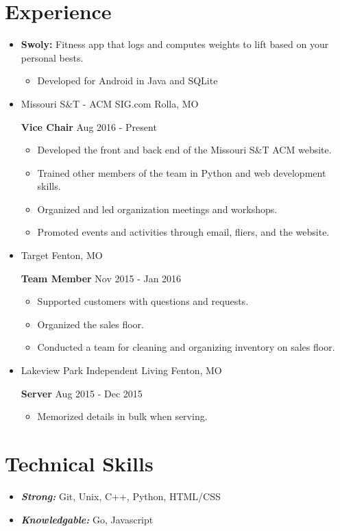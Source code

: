 \documentclass[11pt,oneside]{article}
\begin{document}
\section*{Experience}
\begin{itemize}
	\item[] \textbf{Swoly:} Fitness app that logs and computes weights to lift based on your personal bests.
			\begin{itemize}
				\item[\textbullet] Developed for Android in Java and SQLite
			\end{itemize}
\end{itemize}
\begin{itemize}
	\item[] Missouri S\&T - ACM SIG.com
			\hfill
			Rolla, MO
			
			\textbf{Vice Chair}
			\hfill
			Aug 2016 - Present
			\begin{itemize}
				\item[\textbullet] Developed the front and back end of the Missouri S\&T ACM website.
				\item[\textbullet] Trained other members of the team in Python and web development skills.
				\item[\textbullet] Organized and led organization meetings and workshops.
				\item[\textbullet] Promoted events and activities through email, fliers, and the website.
			\end{itemize}
	\item[] Target
			\hfill
			Fenton, MO
			
			\textbf{Team Member}
			\hfill
			Nov 2015 - Jan 2016
			\begin{itemize}
				\item[\textbullet] Supported customers with questions and requests.
				\item[\textbullet] Organized the sales floor.
				\item[\textbullet] Conducted a team for cleaning and organizing inventory on sales floor.
			\end{itemize}
	\item[] Lakeview Park Independent Living
			\hfill
			Fenton, MO
			
			\textbf{Server}
			\hfill
			Aug 2015 - Dec 2015
			\begin{itemize}
				\item[\textbullet] Memorized details in bulk when serving.
			\end{itemize}
\end{itemize}
\section*{Technical Skills}
\begin{itemize}
	\item[] {\bfseries \itshape Strong:} Git, Unix, C++, Python, HTML/CSS
	\item[] {\bfseries \itshape Knowledgable:} Go, Javascript
\end{itemize}
\end{document}
